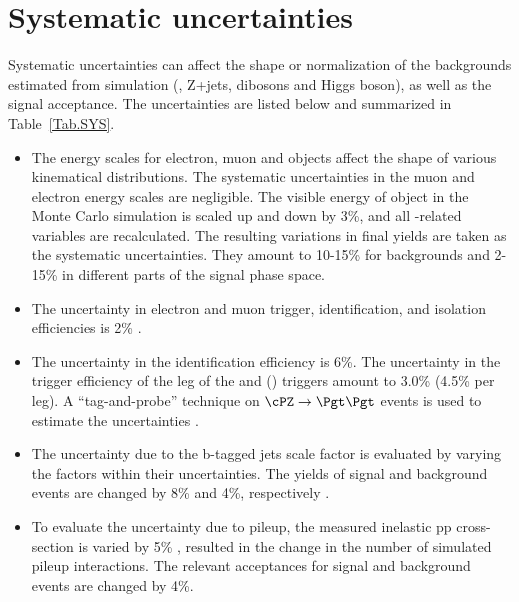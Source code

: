 \section{Systematic uncertainties}
\label{sect:sys}
Systematic uncertainties can affect the shape or normalization of the
backgrounds estimated from simulation (\ttbar, Z+jets, dibosons and Higgs boson), 
as well as the signal acceptance. 
The uncertainties are listed below and summarized in Table~\ref{Tab.SYS}.


\begin{itemize}

\item  The energy scales for electron, muon and \Tau objects affect the shape of various kinematical distributions.
 The systematic uncertainties in the muon and electron energy scales are negligible.
The visible energy of \Tau object in the Monte Carlo simulation is scaled up and down
by 3\%, and all \Tau-related variables are recalculated. The resulting variations in
final yields are taken as the systematic uncertainties. They amount to 10-15\% for 
backgrounds and 2-15\% in different parts of the signal phase space.


\item The uncertainty in electron and muon trigger, identification, and
  isolation efficiencies is 2\% \cite{Khachatryan:2014wca}.

\item The uncertainty in the \Tau identification efficiency is 6\%. 
  The uncertainty in the trigger efficiency of the \Tau leg of the \eTau and
  \muTau (\tauTau) triggers amount to 3.0\% (4.5\% per leg).
  A ``tag-and-probe'' technique on $\cPZ\to \Pgt\Pgt$ events is used to estimate the 
  uncertainties \cite{Khachatryan:2014wca}.

\item The uncertainty due to the b-tagged jets scale factor is evaluated by varying the 
factors within their uncertainties. The yields of signal and background events are changed by 8\% 
and 4\%, respectively \cite{Chatrchyan:2012jua}.
 
\item To evaluate the uncertainty due to pileup, the measured inelastic pp cross-section is
  varied by 5\% \cite{Antchev:2011vs}, resulted in the change in the number of simulated pileup interactions.
 The relevant acceptances for signal and background events are changed by 4\%.


\end{itemize}
